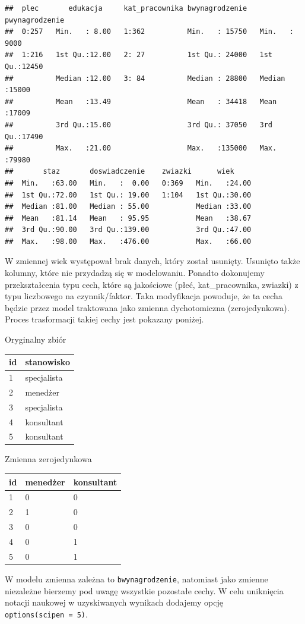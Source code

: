\documentclass[
]{book}
\begin{document}
\begin{verbatim}
##  plec       edukacja     kat_pracownika bwynagrodzenie   pwynagrodzenie 
##  0:257   Min.   : 8.00   1:362          Min.   : 15750   Min.   : 9000  
##  1:216   1st Qu.:12.00   2: 27          1st Qu.: 24000   1st Qu.:12450  
##          Median :12.00   3: 84          Median : 28800   Median :15000  
##          Mean   :13.49                  Mean   : 34418   Mean   :17009  
##          3rd Qu.:15.00                  3rd Qu.: 37050   3rd Qu.:17490  
##          Max.   :21.00                  Max.   :135000   Max.   :79980  
##       staz       doswiadczenie    zwiazki      wiek      
##  Min.   :63.00   Min.   :  0.00   0:369   Min.   :24.00  
##  1st Qu.:72.00   1st Qu.: 19.00   1:104   1st Qu.:30.00  
##  Median :81.00   Median : 55.00           Median :33.00  
##  Mean   :81.14   Mean   : 95.95           Mean   :38.67  
##  3rd Qu.:90.00   3rd Qu.:139.00           3rd Qu.:47.00  
##  Max.   :98.00   Max.   :476.00           Max.   :66.00
\end{verbatim}

W zmiennej wiek występował brak danych, który został usunięty. Usunięto także kolumny, które nie przydadzą się w modelowaniu. Ponadto dokonujemy przekształcenia typu cech, które są jakościowe (płeć, kat\_pracownika, zwiazki) z typu liczbowego na czynnik/faktor. Taka modyfikacja powoduje, że ta cecha będzie przez model traktowana jako zmienna dychotomiczna (zerojedynkowa). Proces trasformacji takiej cechy jest pokazany poniżej.

Oryginalny zbiór

\begin{longtable}[]{@{}ll@{}}
\toprule
id & stanowisko\tabularnewline
\midrule
\endhead
1 & specjalista\tabularnewline
2 & menedżer\tabularnewline
3 & specjalista\tabularnewline
4 & konsultant\tabularnewline
5 & konsultant\tabularnewline
\bottomrule
\end{longtable}

Zmienna zerojedynkowa

\begin{longtable}[]{@{}lll@{}}
\toprule
id & menedżer & konsultant\tabularnewline
\midrule
\endhead
1 & 0 & 0\tabularnewline
2 & 1 & 0\tabularnewline
3 & 0 & 0\tabularnewline
4 & 0 & 1\tabularnewline
5 & 0 & 1\tabularnewline
\bottomrule
\end{longtable}

W modelu zmienna zależna to \texttt{bwynagrodzenie}, natomiast jako zmienne niezależne bierzemy pod uwagę wszystkie pozostałe cechy. W celu uniknięcia notacji naukowej w uzyskiwanych wynikach dodajemy opcję \texttt{options(scipen\ =\ 5)}.
\end{document}
